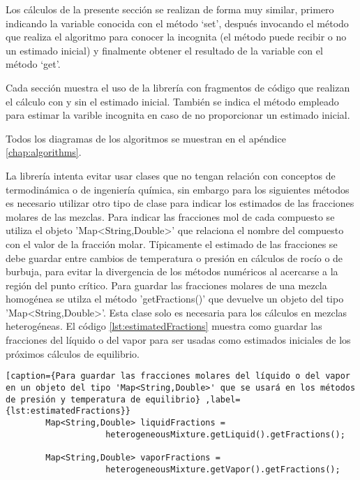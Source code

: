 	Los cálculos de la presente sección se realizan de forma muy similar, primero indicando la variable conocida con el método `set', después invocando el método que realiza el algoritmo para conocer la incognita (el método puede recibir o no un estimado inicial) y finalmente obtener el resultado de la variable con el método `get'.

	Cada sección muestra el uso de la librería con fragmentos de código que realizan el cálculo con y sin el estimado inicial. También se indica el método empleado para estimar la varible incognita en caso de no proporcionar un estimado inicial.

	Todos los diagramas de los algoritmos se muestran en el apéndice \ref{chap:algorithms}.

	La librería \Materia intenta evitar usar clases que no tengan relación con conceptos de termodinámica o de ingeniería química, sin embargo para los siguientes métodos es necesario utilizar otro tipo de clase para indicar los estimados de las fracciones molares de las mezclas. Para indicar las fracciones mol de cada compuesto se utiliza el objeto 'Map<String,Double>' que relaciona el nombre del compuesto con el valor de la fracción molar. Típicamente el estimado de las fracciones se debe guardar entre cambios de temperatura o presión en cálculos de rocío o de burbuja, para evitar la divergencia de los métodos numéricos al acercarse a la región del punto crítico. Para guardar las fracciones molares de una mezcla homogénea se utilza el método 'getFractions()' que devuelve un objeto del tipo 'Map<String,Double>'. Esta clase solo es necesaria para los cálculos en mezclas heterogéneas. El código \ref{lst:estimatedFractions} muestra como guardar las fracciones del líquido o del vapor para ser usadas como estimados iniciales de los próximos cálculos de equilibrio.


	\begin{lstlisting}[caption={Para guardar las fracciones molares del líquido o del vapor en un objeto del tipo 'Map<String,Double>' que se usará en los métodos de presión y temperatura de equilibrio} ,label={lst:estimatedFractions}}
		Map<String,Double> liquidFractions = 
					heterogeneousMixture.getLiquid().getFractions();

		Map<String,Double> vaporFractions = 
					heterogeneousMixture.getVapor().getFractions();
		
	\end{lstlisting}

		

		